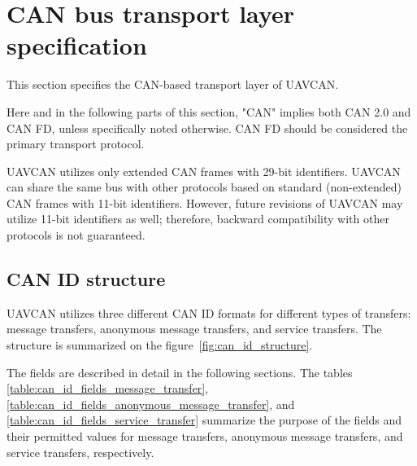 \section{CAN bus transport layer specification}

This section specifies the CAN-based transport layer of UAVCAN.

Here and in the following parts of this section,
"CAN" implies both CAN 2.0 and CAN FD, unless specifically noted otherwise.
CAN FD should be considered the primary transport protocol.

UAVCAN utilizes only extended CAN frames with 29-bit identifiers.
UAVCAN can share the same bus with other protocols based on standard (non-extended) CAN frames with 11-bit identifiers.
However, future revisions of UAVCAN may utilize 11-bit identifiers as well;
therefore, backward compatibility with other protocols is not guaranteed.

\subsection{CAN ID structure}

UAVCAN utilizes three different CAN ID formats for different types of transfers:
message transfers, anonymous message transfers, and service transfers.
The structure is summarized on the figure~\ref{fig:can_id_structure}.

The fields are described in detail in the following sections.
The tables \ref{table:can_id_fields_message_transfer},
\ref{table:can_id_fields_anonymous_message_transfer}, and \ref{table:can_id_fields_service_transfer}
summarize the purpose of the fields and their permitted values
for message transfers, anonymous message transfers, and service transfers, respectively.

